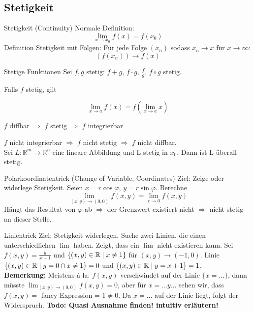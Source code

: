 \subsection{Stetigkeit}

\begin{Definition}{Stetigkeit (Continuity)}{}
    Normale Definition:
    \[
    \lim_{x\rightarrow x_0} f(x) = f(x_0)
    \]
    Definition Stetigkeit mit Folgen: Für jede Folge $(x_n)$ sodass $x_n \rightarrow x$ für $x\rightarrow \infty $:
    \[
    (f(x_n)) \rightarrow f(x)
    \]
\end{Definition}
\begin{Satz}{Stetige Funktionen}{}
    Sei $f,g$ stetig: $f+g$, $f\cdot g$, $\frac{f}{g}$, $f \circ g$ stetig.

    Falls $f$ stetig, gilt

    \[
        \lim_{x \rightarrow a} f(x) = f(\lim_{x\rightarrow a} x)
    \]

    $f$ diffbar $\Rightarrow$ $f$ stetig $\Rightarrow$ $f$ integrierbar

    $f$ nicht integrierbar $\Rightarrow$ $f$ nicht stetig $\Rightarrow$ $f$ nicht diffbar.\\
    Sei $L: \mathbb{R}^m \rightarrow \mathbb{R}^n$ eine lineare Abbildung und L stetig in $x_0$. Dann ist L überall stetig.
\end{Satz}


\begin{Rezept}{Polarkoordinatentrick (Change of Variable, Coordinates)}{}
    Ziel: Zeige oder widerlege Stetigkeit. Seien $x=r\cos \varphi$, $y=r\sin \varphi$. Berechne
    \[
    \lim_{(x, y) \rightarrow (0,0)} f(x, y) = \lim_{r \rightarrow 0} f(x, y)
    \]
    Hängt das Resultat von $\varphi$ ab $\Rightarrow$ der Grenzwert existiert nicht $\Rightarrow$ nicht stetig an dieser Stelle.
\end{Rezept}

\begin{Rezept}{Linientrick}{}
    Ziel: Stetigkeit widerlegen. Suche zwei Linien, die einen unterschiedlichen $\lim$ haben. Zeigt, dass ein $\lim$ nicht existieren kann.
    Sei $f(x, y)=\frac{y}{x+1}$ und $\{(x, y) \in \mathbb{R} \mid x \neq 1\}$ für $(x, y) \rightarrow (-1, 0)$. Linie $\{(x, y) \in \mathbb{R} \mid y=0\cap x \neq 1\}=0$ und $\{(x, y) \in \mathbb{R} \mid y=x+1\}=1$.\\
    
    \textbf{Bemerkung:} Meistens à la: $f(x,y)$ verschwindet auf der Linie $\{x=...\}$, dann müsste $\lim_{(x,y)\rightarrow(0,0)} f(x,y) = 0$, aber für $x=...y...$ sehen wir, dass
    $f(x,y) =$ fancy Expression = $1 \neq 0$. Da $x=...$ auf der Linie liegt, folgt der Widerspruch. \textbf{Todo: Quasi Ausnahme finden! intuitiv erläutern!}
\end{Rezept}

